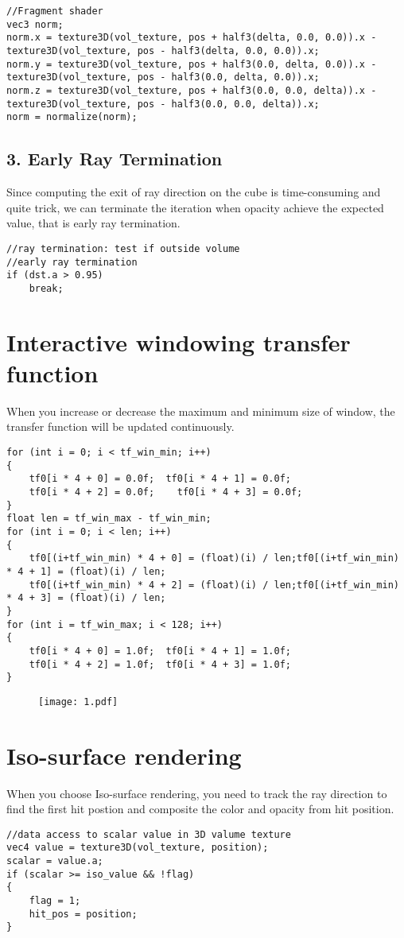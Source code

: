 \documentclass[12pt,letterpaper,fleqn]{article}          %
\begin{document}
\begin{lstlisting}
//Fragment shader
vec3 norm;
norm.x = texture3D(vol_texture, pos + half3(delta, 0.0, 0.0)).x - texture3D(vol_texture, pos - half3(delta, 0.0, 0.0)).x;
norm.y = texture3D(vol_texture, pos + half3(0.0, delta, 0.0)).x - texture3D(vol_texture, pos - half3(0.0, delta, 0.0)).x;
norm.z = texture3D(vol_texture, pos + half3(0.0, 0.0, delta)).x - texture3D(vol_texture, pos - half3(0.0, 0.0, delta)).x;
norm = normalize(norm);
\end{lstlisting}

\subsection*{3. Early Ray Termination}
Since computing the exit of ray direction on the cube is time-consuming and quite trick, we can terminate the iteration when opacity achieve the 
expected value, that is early ray termination.

\begin{lstlisting}
//ray termination: test if outside volume
//early ray termination
if (dst.a > 0.95)
	break;
\end{lstlisting}

\section{Interactive windowing transfer function}
When you increase or decrease the maximum and minimum size of window, the transfer function will be updated continuously.

\begin{lstlisting}
for (int i = 0; i < tf_win_min; i++)
{
	tf0[i * 4 + 0] = 0.0f; 	tf0[i * 4 + 1] = 0.0f;
	tf0[i * 4 + 2] = 0.0f;    tf0[i * 4 + 3] = 0.0f;
}
float len = tf_win_max - tf_win_min;
for (int i = 0; i < len; i++)
{
    tf0[(i+tf_win_min) * 4 + 0] = (float)(i) / len;tf0[(i+tf_win_min) * 4 + 1] = (float)(i) / len;
    tf0[(i+tf_win_min) * 4 + 2] = (float)(i) / len;tf0[(i+tf_win_min) * 4 + 3] = (float)(i) / len;
}
for (int i = tf_win_max; i < 128; i++)
{
	tf0[i * 4 + 0] = 1.0f;	tf0[i * 4 + 1] = 1.0f;
	tf0[i * 4 + 2] = 1.0f;	tf0[i * 4 + 3] = 1.0f;
}
\end{lstlisting}


\begin{figure}[!htb]
\centering
\texttt{[image: 1.pdf]}
\end{figure}

\section{Iso-surface rendering}
When you choose Iso-surface rendering, you need to track the ray direction to find the first hit postion and composite the color and opacity from hit position. 
\begin{lstlisting}
//data access to scalar value in 3D valume texture
vec4 value = texture3D(vol_texture, position);
scalar = value.a;
if (scalar >= iso_value && !flag)
{
	flag = 1;
	hit_pos = position;
}
\end{lstlisting}
\end{document}
